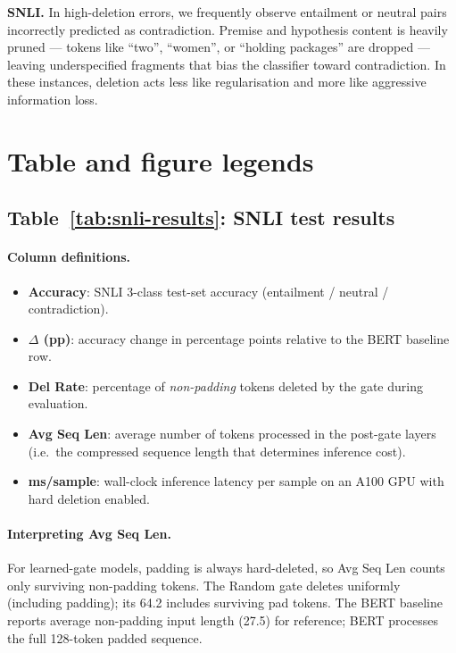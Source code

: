 \documentclass{article} %
\begin{document}
\textbf{SNLI.} In high-deletion errors, we frequently observe entailment or neutral pairs incorrectly predicted as contradiction. Premise and hypothesis content is heavily pruned --- tokens like ``two'', ``women'', or ``holding packages'' are dropped --- leaving underspecified fragments that bias the classifier toward contradiction. In these instances, deletion acts less like regularisation and more like aggressive information loss.


\section{Table and figure legends}
\label{app:legends}

\subsection{Table~\ref{tab:snli-results}: SNLI test results}

\paragraph{Column definitions.}
\begin{itemize}[nosep]
    \item \textbf{Accuracy}: SNLI 3-class test-set accuracy (entailment / neutral / contradiction).
    \item \textbf{$\Delta$ (pp)}: accuracy change in percentage points relative to the BERT baseline row.
    \item \textbf{Del Rate}: percentage of \emph{non-padding} tokens deleted by the gate during evaluation.
    \item \textbf{Avg Seq Len}: average number of tokens processed in the post-gate layers (i.e.\ the compressed sequence length that determines inference cost).
    \item \textbf{ms/sample}: wall-clock inference latency per sample on an A100 GPU with hard deletion enabled.
\end{itemize}

\paragraph{Interpreting Avg Seq Len.}
For learned-gate models, padding is always hard-deleted, so Avg Seq Len counts only surviving non-padding tokens. The Random gate deletes uniformly (including padding); its 64.2 includes surviving pad tokens. The BERT baseline reports average non-padding input length (27.5) for reference; BERT processes the full 128-token padded sequence.
\end{document}
